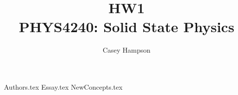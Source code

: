 \documentclass[titlepage]{article}
\title{HW1 \\[5pt] PHYS4240: Solid State Physics}
\author{Casey Hampson}
\begin{document}
    \maketitle
    \pagebreak

    {Authors.tex}
    {Essay.tex}
    {NewConcepts.tex}
\end{document}
